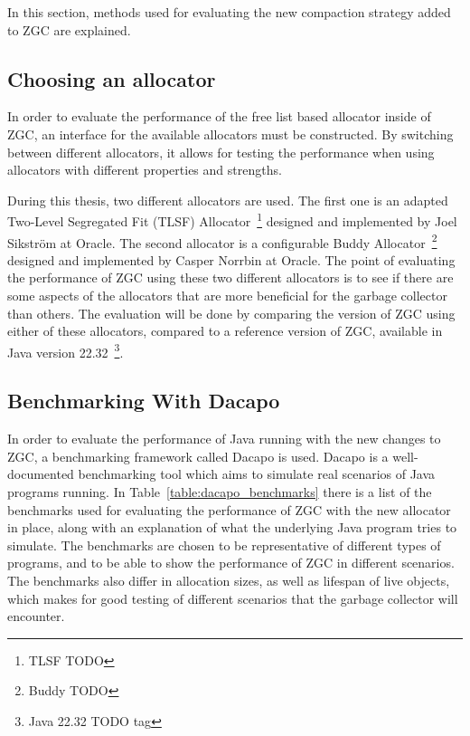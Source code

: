 In this section, methods used for evaluating the new compaction strategy added to ZGC are explained.
\subsection{Choosing an allocator}
In order to evaluate the performance of the free list based allocator inside of ZGC, an interface for the available allocators must be constructed. By switching between different allocators, it allows for testing the performance when using allocators with different properties and strengths.

During this thesis, two different allocators are used. The first one is an adapted Two-Level Segregated Fit (TLSF) Allocator~\footnote{TLSF TODO} designed and implemented by Joel Sikström at Oracle. The second allocator is a configurable Buddy Allocator~\footnote{Buddy TODO} designed and implemented by Casper Norrbin at Oracle. The point of evaluating the performance of ZGC using these two different allocators is to see if there are some aspects of the allocators that are more beneficial for the garbage collector than others. The evaluation will be done by comparing the version of ZGC using either of these allocators, compared to a reference version of ZGC, available in Java version 22.32~\footnote{Java 22.32 TODO tag}.

\subsection{Benchmarking With Dacapo}
In order to evaluate the performance of Java running with the new changes to ZGC, a benchmarking framework called Dacapo is used. Dacapo is a well-documented benchmarking tool which aims to simulate real scenarios of Java programs running. In Table~\ref{table:dacapo_benchmarks} there is a list of the benchmarks used for evaluating the performance of ZGC with the new allocator in place, along with an explanation of what the underlying Java program tries to simulate. The benchmarks are chosen to be representative of different types of programs, and to be able to show the performance of ZGC in different scenarios. The benchmarks also differ in allocation sizes, as well as lifespan of live objects, which makes for good testing of different scenarios that the garbage collector will encounter.

